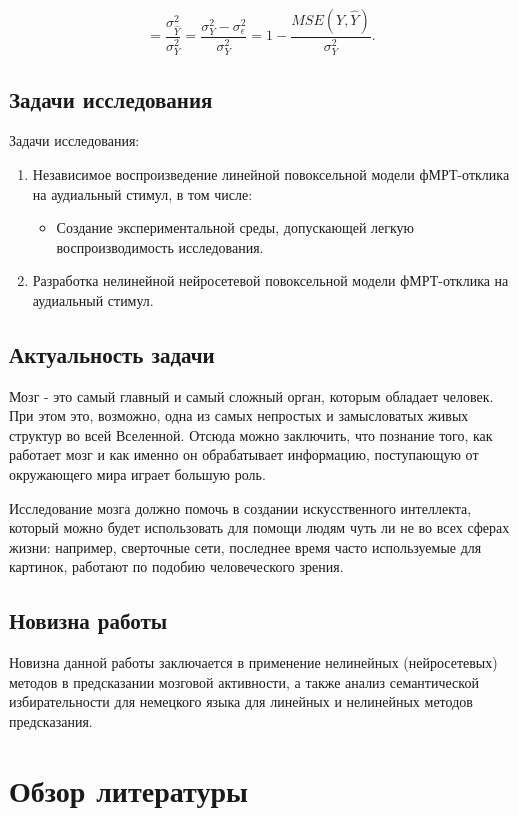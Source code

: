 \documentclass[pdftex,ptm,12pt,a4paper]{report}
\theoremstyle{definition}
\begin{document}
$$= \frac{\sigma^2_{\hat{Y}}}{\sigma^2_{Y}} = \frac{\sigma^2_{Y} - \sigma^2_{\epsilon}}{\sigma^2_{Y}} = 1 - \frac{MSE(Y, \hat{Y})}{\sigma^2_{Y}}.$$


\section{Задачи исследования}
Задачи исследования:
\begin{enumerate}
\item Независимое воспроизведение линейной повоксельной модели фМРТ-отклика на аудиальный стимул, в том числе:
\begin{itemize}
\item Создание экспериментальной среды, допускающей
легкую воспроизводимость исследования.
\end{itemize}
\item Разработка нелинейной нейросетевой повоксельной
модели фМРТ-отклика на аудиальный стимул.
\end{enumerate}

\section{Актуальность задачи}

Мозг - это самый главный и самый сложный орган, которым обладает человек. При этом это, возможно, одна из самых непростых и замысловатых живых структур во всей Вселенной. Отсюда можно заключить, что познание того, как работает мозг и как именно он обрабатывает информацию, поступающую от окружающего мира играет большую роль. 

Исследование мозга должно помочь в создании искусственного интеллекта, который можно будет использовать для помощи людям чуть ли не во всех сферах жизни: например, сверточные сети, последнее время часто используемые для картинок, работают по подобию человеческого зрения.

\section{Новизна работы}

Новизна данной работы заключается в применение нелинейных (нейросетевых) методов в предсказании мозговой активности, а также анализ семантической избирательности для немецкого языка для линейных и нелинейных методов предсказания.

\chapter{Обзор литературы}
\end{document}
